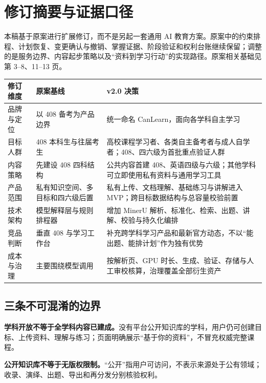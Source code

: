 \documentclass[UTF8,a4paper,11pt,fontset=none]{ctexart}
\newcommand{\cth}[1]{\textbf{\sffamily #1}}
\newenvironment{tbl}{\par\vspace{3pt}\small\noindent\ignorespaces}{\unskip\par\vspace{5pt}}
\begin{document}
\tableofcontents

\clearpage
\section*{修订摘要与证据口径}
本稿基于原案进行扩展修订，而不是另起一套通用 AI 教育方案。原案中的约束排程、计划恢复、变更确认与撤销、掌握证据、阶段验证和权利台账继续保留；调整的是服务边界、内容起步策略以及“资料到学习行动”的实现路径。原案相关基础见第 3--8、11--13 页。\cite{original}

\begin{tbl}
\begin{tabularx}{\linewidth}{@{}L{24mm}YY@{}}
\toprule
\cth{修订维度}&\cth{原案基线}&\cth{v2.0 决策}\\\midrule
品牌与定位&以 408 备考为产品边界&统一命名 CanLearn，面向各学科自主学习\\
目标人群&408 本科生与往届考生&高校课程学习者、各类自主备考者与成人自学者；408、四六级为首批重点验证人群\\
内容策略&先建设 408 四科结构&公共内容首建 408、英语四级与六级；其他学科可立即使用私有资料与通用学习工具\\
产品范围&私有知识空间、多目标和四六级后置&私有上传、文档理解、基础练习与讲解进入 MVP；跨目标数据结构与总容量校验前置\\
技术架构&模型解释层与规则排程器&增加 MinerU 解析、标准化、检索、出题、讲解、校验与持久化编排\\
竞品判断&垂直 408 与学习工作台&补充跨学科学习产品和最新官方动态，不以“能出题、能排计划”作为独有优势\\
成本与治理&主要围绕模型调用&按解析页、GPU 时长、生成、验证、存储与人工审校核算，治理覆盖全部衍生资产\\
\bottomrule
\end{tabularx}
\end{tbl}

\subsection*{三条不可混淆的边界}
\textbf{学科开放不等于全学科内容已建成。}没有平台公开知识库的学科，用户仍可创建目标、上传资料、理解与练习；页面明确展示“基于你的资料”，不冒充权威完整课程。

\textbf{公开知识库不等于无版权限制。}“公开”指用户可访问，不表示来源处于公有领域；收录、演绎、出题、导出和再分发分别核验权利。
\end{document}
